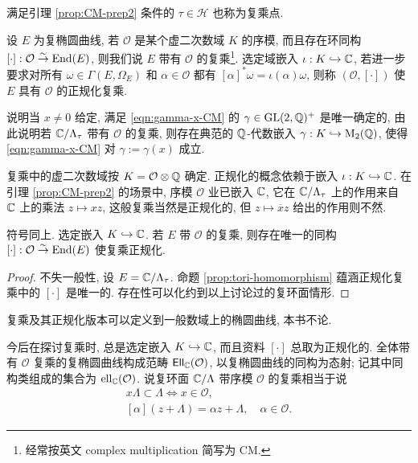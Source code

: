 满足引理 \ref{prop:CM-prep2} 条件的 $\tau \in \mathcal{H}$ 也称为复乘点. 

\begin{definition}[复乘]
	设 $E$ 为复椭圆曲线, 若 $\mathcal{O}$ 是某个虚二次数域 $K$ 的序模, 而且存在环同构 $[\cdot]: \mathcal{O} \stackrel{\sim}{\rightarrow} \operatorname{End}(E)$, 则我们说 $E$ 带有 $\mathcal{O}$ 的复乘\footnote{经常按英文 complex multiplication 简写为 CM.}. 选定域嵌入 $\iota: K \hookrightarrow \mathbb{C}$, 若进一步要求对所有 $\omega \in \Gamma(E, \Omega_E)$ 和 $\alpha \in \mathcal{O}$ 都有 $[\alpha]^* \omega = \iota(\alpha) \omega$, 则称 $(\mathcal{O}, [\cdot])$ 使 $E$ 具有 $\mathcal{O}$ 的正规化复乘.
\end{definition}

\begin{exercise}
	说明当 $x \neq 0$ 给定, 满足 \eqref{eqn:gamma-x-CM} 的 $\gamma \in \operatorname{GL}(2, \mathbb{Q})^+$ 是唯一确定的, 由此说明若 $\mathbb{C}/\Lambda_\tau$ 带有 $\mathcal{O}$ 的复乘, 则存在典范的 $\mathbb{Q}$-代数嵌入 $\gamma: K \hookrightarrow \operatorname{M}_2(\mathbb{Q})$, 使得 \eqref{eqn:gamma-x-CM} 对 $\gamma := \gamma(x)$ 成立.
\end{exercise}

复乘中的虚二次数域按 $K = \mathcal{O} \otimes \mathbb{Q}$ 确定. 正规化的概念依赖于嵌入 $\iota: K \hookrightarrow \mathbb{C}$. 在引理 \ref{prop:CM-prep2} 的场景中, 序模 $\mathcal{O}$ 业已嵌入 $\mathbb{C}$, 它在 $\mathbb{C}/\Lambda_\tau$ 上的作用来自 $\mathbb{C}$ 上的乘法 $z \mapsto xz$, 这般复乘当然是正规化的, 但 $z \mapsto \overline{x} z$ 给出的作用则不然. 

\begin{lemma}
	符号同上. 选定嵌入 $K \hookrightarrow \mathbb{C}$. 若 $E$ 带 $\mathcal{O}$ 的复乘, 则存在唯一的同构 $[\cdot]: \mathcal{O} \stackrel{\sim}{\rightarrow} \operatorname{End}(E)$ 使复乘正规化.
\end{lemma}
\begin{proof}
	不失一般性, 设 $E = \mathbb{C}/\Lambda_\tau$. 命题 \ref{prop:tori-homomorphism} 蕴涵正规化复乘中的 $[\cdot]$ 是唯一的. 存在性可以化约到以上讨论过的复环面情形.
\end{proof}

复乘及其正规化版本可以定义到一般数域上的椭圆曲线, 本书不论.

今后在探讨复乘时, 总是选定嵌入 $K \hookrightarrow \mathbb{C}$, 而且资料 $[\cdot]$ 总取为正规化的. 全体带有 $\mathcal{O}$ 复乘的复椭圆曲线构成范畴 $\mathsf{Ell}_{\mathbb{C}}(\mathcal{O})$, 以复椭圆曲线的同构为态射; 记其中同构类组成的集合为 $\mathrm{ell}_{\mathbb{C}}(\mathcal{O})$. 说复环面 $\mathbb{C}/\Lambda$ 带序模 $\mathcal{O}$ 的复乘相当于说
\begin{equation}\label{eqn:CM-lattice} \begin{gathered}
	x\Lambda \subset \Lambda \iff x \in \mathcal{O},\\
	[\alpha](z + \Lambda) = \alpha z + \Lambda, \quad \alpha \in \mathcal{O}.
\end{gathered}\end{equation}

